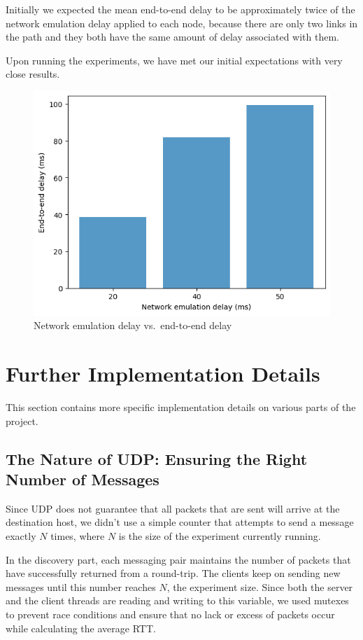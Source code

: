 \documentclass[conference]{IEEEtran}
\begin{document}
Initially we expected the mean end-to-end delay to be approximately twice of the network emulation
delay applied to each node, because there are only two links in the path and they both have the
same amount of delay associated with them.

Upon running the experiments, we have met our initial expectations with very close results.

\begin{figure}
    \center
    \includegraphics[width=\columnwidth]{images/chart}
    \caption{Network emulation delay vs.\ end-to-end delay}
    \label{fig:graph}
\end{figure}


\section{Further Implementation Details}
This section contains more specific implementation details on various parts of the project.

\subsection{The Nature of UDP: Ensuring the Right Number of Messages}
Since UDP does not guarantee that all packets that are sent will arrive at the destination host,
we didn't use a simple counter that attempts to send a message exactly $N$ times, where $N$ is the
size of the experiment currently running.

In the discovery part, each messaging pair maintains the number of packets that have successfully
returned from a round-trip. The clients keep on sending new messages until this number reaches $N$,
the experiment size. Since both the server and the client threads are reading and writing to this
variable, we used mutexes to prevent race conditions and ensure that no lack or excess of packets
occur while calculating the average RTT.
\end{document}
